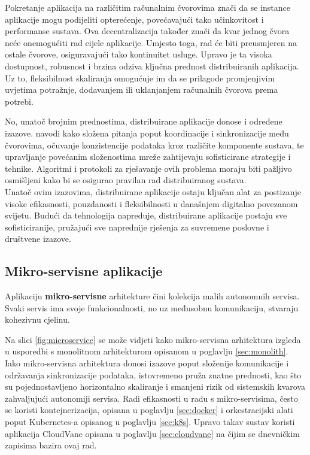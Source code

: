 \documentclass[times, utf8, diplomski]{fer}
\begin{document}
Pokretanje aplikacija na različitim računalnim čvorovima znači da se instance aplikacije mogu podijeliti opterećenje, povećavajući tako učinkovitost i performanse sustava. Ova decentralizacija također znači da kvar jednog čvora neće onemogućiti rad cijele aplikacije. Umjesto toga, rad će biti preusmjeren na ostale čvorove, osiguravajući tako kontinuitet usluge. Upravo je ta visoka dostupnost, robusnost i brzina odziva ključna prednost distribuiranih aplikacija. Uz to, fleksibilnost skaliranja omogućuje im da se prilagode promjenjivim uvjetima potražnje, dodavanjem ili uklanjanjem računalnih čvorova prema potrebi.

No, unatoč brojnim prednostima, distribuirane aplikacije donose i određene izazove. \citet{zarko_raspodijeljeni_2013} navodi kako složena pitanja poput koordinacije i sinkronizacije među čvorovima, očuvanje konzistencije podataka kroz različite komponente sustava, te upravljanje povećanim složenostima mreže zahtijevaju sofisticirane strategije i tehnike. Algoritmi i protokoli za rješavanje ovih problema moraju biti pažljivo osmišljeni kako bi se osigurao pravilan rad distribuiranog sustava. \\

Unatoč ovim izazovima, distribuirane aplikacije ostaju ključan alat za postizanje visoke efikasnosti, pouzdanosti i fleksibilnosti u današnjem digitalno povezanom svijetu. Budući da tehnologija napreduje, distribuirane aplikacije postaju sve sofisticiranije, pružajući sve naprednije rješenja za suvremene poslovne i društvene izazove.

\subsection{Mikro-servisne aplikacije}
\label{sec:microservices}

Aplikaciju \textbf{mikro-servisne} arhitekture  čini kolekcija malih autonomnih servisa. Svaki servis ima svoje funkcionalnosti, no uz međusobnu komunikaciju, stvaraju kohezivnu cjelinu.

Na slici \ref{fig:microservice} se može vidjeti kako mikro-servisna arhitektura izgleda u usporedbi s monolitnom arhitekturom opisanom u poglavlju \ref{sec:monolith}. Iako mikro-servisna arhitektura donosi izazove poput složenije komunikacije i održavanja sinkronizacije podataka, istovremeno pruža znatne prednosti, kao što su pojednostavljeno horizontalno skaliranje i smanjeni rizik od sistemskih kvarova zahvaljujući autonomiji servisa.
Radi efikasnosti u radu s mikro-servisima, često se koristi kontejnerizacija, opisana u poglavlju \ref{sec:docker} i  orkestracijski alati poput Kubernetes-a opisanog u poglavlju \ref{sec:k8s}. Upravo takav sustav koristi aplikacija CloudVane opisana u poglavlju \ref{sec:cloudvane} na čijim se dnevničkim zapisima bazira ovaj rad.
\end{document}
